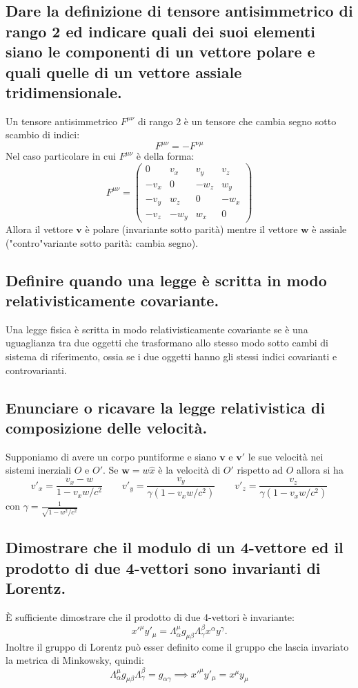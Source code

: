 \subsection[ $\ $Tensore antisimmetrico di rango 2]{Dare la definizione di tensore antisimmetrico di rango 2 ed indicare quali dei suoi elementi siano le componenti di un vettore polare e quali quelle di un vettore assiale tridimensionale.}
Un tensore antisimmetrico $F^{\mu \nu}$ di rango 2 è un tensore che cambia segno sotto scambio di indici:
\[
	F^{\mu \nu} = -F^{\nu \mu}
\]
Nel caso particolare in cui $F^{\mu \nu}$ è della forma:
\[
	F^{\mu \nu} = 
\left( 
\begin{array}{c|ccc}
	0 & v_{x} & v_{y} & v_{z} \\
	\hline
	-v_{x} & 0 & -w_{z} & w_{y} \\
	-v_{y} & w_{z} & 0 & -w_{x} \\
	-v_{z} & -w_{y} & w_{x} & 0
\end{array}
\right) 
\] 
Allora il vettore $\boldsymbol{v}$ è polare (invariante sotto parità) mentre il vettore $\boldsymbol{w}$ è assiale ("contro"variante sotto parità: cambia segno).
\subsection[$\ $ Legge relativisticamente covariante]{Definire quando una legge è scritta in modo relativisticamente covariante.}
Una legge fisica è scritta in modo relativisticamente covariante se è una uguaglianza tra due oggetti che trasformano allo stesso modo sotto cambi di sistema di riferimento, ossia se i due oggetti hanno gli stessi indici covarianti e controvarianti. 
\subsection[$\ $ Composizione delle velocità]{Enunciare o ricavare la legge relativistica di composizione delle velocità.}
Supponiamo di avere un corpo puntiforme e siano $\boldsymbol{v}$ e $\boldsymbol{v'}$ le sue velocità nei sistemi inerziali $O$ e  $O'$.
Se  $\boldsymbol{w} = w \hat{x}$ è la velocità di $O'$ rispetto ad $O$ allora si ha 
\[
	v'_{x} = \frac{v_{x} - w}{1 - v_{x}w/c^{2}} \quad \quad
	v'_{y} = \frac{v_{y}}{\gamma \left( 1 - v_{x}w/c^{2} \right) } \quad \quad
	v'_{z} = \frac{v_{z}}{\gamma \left( 1 - v_{x}w/c^{2} \right) }
\]
con $\gamma = \frac{1}{\sqrt{1 - w^{2}/c^{2}}}$

\subsection[$\ $ Prodotto di 4-vettori invariante di Lorentz]{Dimostrare che il modulo di un 4-vettore ed il prodotto di due 4-vettori sono invarianti di Lorentz.} 
È sufficiente dimostrare che il prodotto di due 4-vettori è invariante:
\[
	x'^{\mu} y'_{\mu} = \Lambda^{\mu}_{\alpha} g_{\mu \beta} \Lambda^{\beta}_{\gamma} x^{\alpha} y^{\gamma}
.\]
Inoltre il gruppo di Lorentz può esser definito come il gruppo che lascia invariato la metrica di Minkowsky, quindi:
\[
	\Lambda^{\mu}_{\alpha} g_{\mu \beta} \Lambda^{\beta}_{\gamma} = g_{\alpha \gamma} \implies x'^{\mu}y'_{\mu} = x^{\mu}y_{\mu}
\]  
